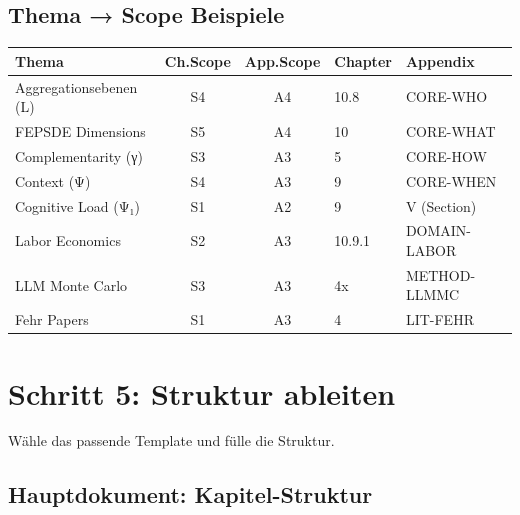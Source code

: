 \documentclass[12pt,a4paper]{article}
\begin{document}
\subsection{Thema → Scope Beispiele}

\begin{table}[htbp]
\centering
\small
\begin{tabular}{@{}lccll@{}}
\toprule
\textbf{Thema} & \textbf{Ch.Scope} & \textbf{App.Scope} & \textbf{Chapter} & \textbf{Appendix} \\
\midrule
Aggregationsebenen (L) & S4 & A4 & 10.8 & CORE-WHO \\
FEPSDE Dimensions & S5 & A4 & 10 & CORE-WHAT \\
Complementarity (γ) & S3 & A3 & 5 & CORE-HOW \\
Context (Ψ) & S4 & A3 & 9 & CORE-WHEN \\
Cognitive Load (Ψ₁) & S1 & A2 & 9 & V (Section) \\
Labor Economics & S2 & A3 & 10.9.1 & DOMAIN-LABOR \\
LLM Monte Carlo & S3 & A3 & 4x & METHOD-LLMMC \\
Fehr Papers & S1 & A3 & 4 & LIT-FEHR \\
\bottomrule
\end{tabular}
\end{table}


\section{Schritt 5: Struktur ableiten}

\begin{tcolorbox}[colback=gray!5!white, colframe=gray!75!black,
    title=\textbf{Schritt 5: Welche Gliederung und welches Template?}]

Wähle das passende Template und fülle die Struktur.

\end{tcolorbox}

\subsection{Hauptdokument: Kapitel-Struktur}
\end{document}
